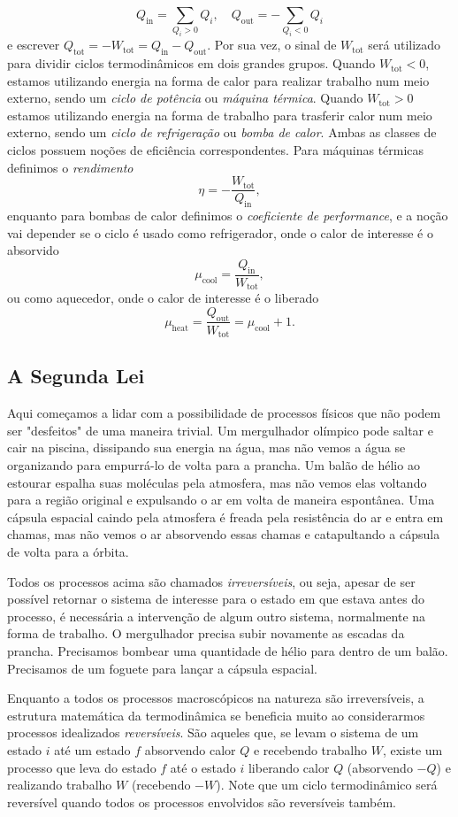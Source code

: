 \documentclass[a4paper, 12pt]{article}
\theoremstyle{definition}
\theoremstyle{definition}
\begin{document}
$$Q_\text{in}=\sum_{Q_i>0}Q_i,\quad Q_\text{out}=-\sum_{Q_i<0}Q_i$$
e escrever $Q_\text{tot}=-W_\text{tot}=Q_\text{in}-Q_\text{out}$. Por sua vez, o sinal de $W_\text{tot}$
será utilizado para dividir ciclos termodinâmicos em dois grandes grupos. Quando $W_\text{tot}<0$, estamos
utilizando energia na forma de calor para realizar trabalho num meio externo, sendo um \textit{ciclo de 
potência} ou \textit{máquina térmica}. Quando $W_\text{tot}>0$ estamos utilizando energia na forma de
trabalho para trasferir calor num meio externo, sendo um \textit{ciclo de refrigeração} ou \textit{bomba
de calor}. Ambas as classes de ciclos possuem noções de eficiência correspondentes. Para máquinas térmicas 
definimos o \textit{rendimento}
$$\eta=-\frac{W_\text{tot}}{Q_\text{in}},$$
enquanto para bombas de calor definimos o \textit{coeficiente de performance}, e a noção vai depender se o 
ciclo é usado como refrigerador, onde o calor de interesse é o absorvido
$$\mu_\text{cool}=\frac{Q_\text{in}}{W_\text{tot}},$$
ou como aquecedor, onde o calor de interesse é o liberado
$$\mu_\text{heat}=\frac{Q_\text{out}}{W_\text{tot}}=\mu_\text{cool}+1.$$

\subsection{A Segunda Lei}

Aqui começamos a lidar com a possibilidade de processos físicos que não podem ser "desfeitos" de uma
maneira trivial. Um mergulhador olímpico pode saltar e cair na piscina, dissipando sua energia na água,
mas não vemos a água se organizando para empurrá-lo de volta para a prancha. Um balão de hélio ao estourar
espalha suas moléculas pela atmosfera, mas não vemos elas voltando para a região original e expulsando
o ar em volta de maneira espontânea. Uma cápsula espacial caindo pela atmosfera é freada pela resistência 
do ar e entra em chamas, mas não vemos o ar absorvendo essas chamas e catapultando a cápsula de volta para
a órbita. 

Todos os processos acima são chamados \textit{irreversíveis}, ou seja, apesar de ser possível retornar o 
sistema de interesse para o estado em que estava antes do processo, é necessária a intervenção de algum outro
sistema, normalmente na forma de trabalho. O mergulhador precisa subir novamente as escadas da prancha.
Precisamos bombear uma quantidade de hélio para dentro de um balão. Precisamos de um foguete para lançar a
cápsula espacial. 

Enquanto a todos os processos macroscópicos na natureza são irreversíveis, a estrutura matemática da
termodinâmica se beneficia muito ao considerarmos processos idealizados \textit{reversíveis}. São aqueles que,
se levam o sistema de um estado $i$ até um estado $f$ absorvendo calor $Q$ e recebendo trabalho $W$, existe
um processo que leva do estado $f$ até o estado $i$ liberando calor $Q$ (absorvendo $-Q$) e realizando 
trabalho $W$ (recebendo $-W$). Note que um ciclo termodinâmico será reversível quando todos os
processos envolvidos são reversíveis também.
\end{document}
